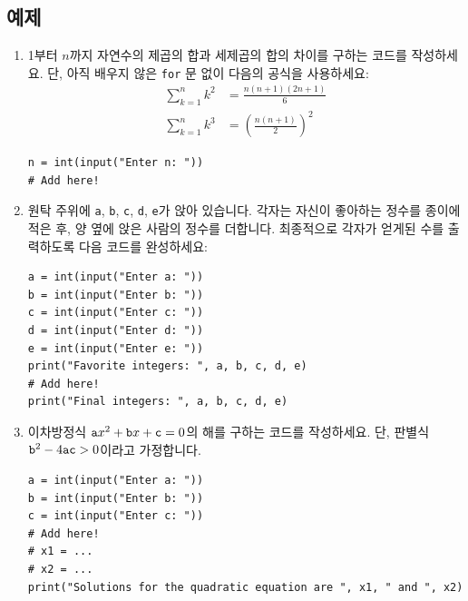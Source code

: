 \documentclass[../main.tex]{subfiles}
\begin{document}
\subsection{예제}
\begin{enumerate}
  \item 1부터 $n$까지 자연수의 제곱의 합과 세제곱의 합의 차이를 구하는 코드를
    작성하세요.
    단, 아직 배우지 않은 \verb|for| 문 없이 다음의 공식을 사용하세요:
    \begin{align*}
      \sum^{n}_{k = 1} k^2 &= \frac{n(n + 1)(2n + 1)}{6}\\
      \sum^{n}_{k = 1} k^3 &= \left(\frac{n(n + 1)}{2}\right)^2
    \end{align*}
    \begin{verbatim}
n = int(input("Enter n: "))
# Add here!
    \end{verbatim}

  \item 원탁 주위에 \verb|a|, \verb|b|, \verb|c|, \verb|d|, \verb|e|가 앉아
    있습니다.
    각자는 자신이 좋아하는 정수를 종이에 적은 후, 양 옆에 앉은 사람의 정수를
    더합니다.
    최종적으로 각자가 얻게된 수를 출력하도록 다음 코드를 완성하세요:
    \begin{verbatim}
a = int(input("Enter a: "))
b = int(input("Enter b: "))
c = int(input("Enter c: "))
d = int(input("Enter d: "))
e = int(input("Enter e: "))
print("Favorite integers: ", a, b, c, d, e)
# Add here!
print("Final integers: ", a, b, c, d, e)
    \end{verbatim}

  \item 이차방정식 $\verb|a|x^2 + \verb|b|x + \verb|c| = 0$의 해를 구하는
    코드를 작성하세요.
    단, 판별식 $\verb|b|^2 - 4\verb|ac| > 0$이라고 가정합니다.

    \begin{verbatim}
a = int(input("Enter a: "))
b = int(input("Enter b: "))
c = int(input("Enter c: "))
# Add here!
# x1 = ...
# x2 = ...
print("Solutions for the quadratic equation are ", x1, " and ", x2)
    \end{verbatim}


\end{enumerate}
\end{document}
